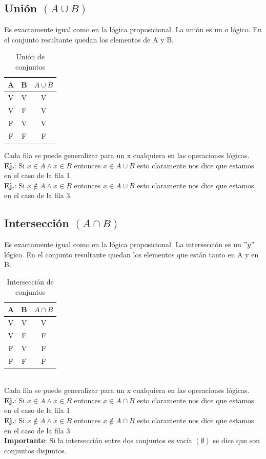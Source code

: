 \documentclass[10pt,a4paper]{article}
\begin{document}
\subsection*{Unión $(A \cup B)$}
Es exactamente igual como en la lógica proposicional. La unión es un $o$ lógico. En el conjunto resultante quedan los elementos de A y B. \\

\begin{table}[h!]
    \centering
    \begin{tabular}{|c | c | c|}
    \hline
    \textbf{A} & \textbf{B} & \textbf{$A \cup B$} \\[0.1cm]
    \hline
    V & V & V \\
    V & F & V \\
    F & V & V \\
    F & F & F \\
    \hline
    \end{tabular}
    \caption{Unión de conjuntos}
\end{table} 
Cada fila se puede generalizar para un x cualquiera en las operaciones lógicas. \\
\textbf{Ej.}: Si $x \in A \land x \in B$ entonces $ x \in A \cup B$ esto claramente nos dice que estamos en el caso de la fila 1. \\
\textbf{Ej.}: Si $x \notin A \land x \in B$ entonces $ x \in A \cup B$ esto claramente nos dice que estamos en el caso de la fila 3.
\subsection*{Intersección $(A \cap B)$}
Es exactamente igual como en la lógica proposicional. La intersección es un $"y"$ lógico. En el conjunto resultante quedan los elementos que están tanto en A y en B.
\begin{table}[h!]
    \centering
    \begin{tabular}{|c | c | c|}
    \hline
    \textbf{A} & \textbf{B} & \textbf{$A \cap B$} \\[0.1cm]
    \hline
    V & V & V \\
    V & F & F \\
    F & V & F \\
    F & F & F \\
    \hline
    \end{tabular}
    \caption{Intersección de conjuntos}
\end{table} \\
Cada fila se puede generalizar para un x cualquiera en las operaciones lógicas. \\
\textbf{Ej.}: Si $x \in A \land x \in B$ entonces $ x \in A \cap B$ esto claramente nos dice que estamos en el caso de la fila 1. \\
\textbf{Ej.}: Si $x \notin A \land x \in B$ entonces $ x \notin A \cap B$ esto claramente nos dice que estamos en el caso de la fila 3. \\
\textbf{Importante}: Si la intersección entre dos conjuntos es vacía $(\emptyset)$ se dice que son conjuntos disjuntos.
\end{document}
